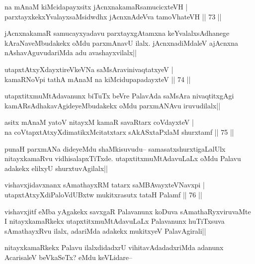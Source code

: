 \begin{shl}
na mAnaM kiMcidapayxsitx jAcnxnakamaRsamucicxteVH |\\
parxtayxkekxYvalayxsaMsidwdhx jAcnxnAdeVva tamoVhateVH \hfill || 73 ||
\end{shl}

\begin{artha}
jAcnxnakamaR samucayxyadavu parxtayxgAtamxna keYvalalxsAdhanege kAraNaveMbudakekx oMdu parxmAnavU ilalx. jAcnxnadiMdaleV ajAcnxna nAshavAguvudariMda adu avashayxvilalx||
\end{artha}

\begin{shl}
utapxtAtxyXdayxtireVkeVNa saMsAravinivaqtatxyeV |\\
kamaRNoV\s pi tathA mAnaM na kiMcidupapadayxteV \hfill || 74 ||
\end{shl}

\begin{artha}
utapxtitxmuMtAdavanunx biTuTx beVre PalavAda saMsAra nivaqtitxgAgi kamARsAdhakavAgideyeMbudakekx oMdu parxmANAvu iruvudilalx||
\end{artha}


\begin{shl}
asitx mAnaM yatoV nitayxM kamaR savaRtarx coVdayxteV |\\
na coVtapxtAtxyXdimatikxMcitatxtarx sAkASxtaPxlaM shurxtamf \hfill || 75 ||
\end{shl}

\begin{artha}
punaH parxmANa dideyeMdu shaMkisuvudu-- samasatxshurxtigaLalUlx nitayxkamaRvu vidhisalapxTiTxde. utapxtitxmuMtAdavuLaLx oMdu Palavu adakekx elilxyU shurxtuvAgilalx||
\end{artha}

\begin{shl}
vishavxjidavxnanx sAmathayxRM tatarx saMBAvayxteV\s Navxpi |\\
utapxtAtxyXdiPaloVdUBxtw mukitxrasutx tataH Palamf \hfill || 76 ||
\end{shl}

\begin{artha}
vishavxjitf eMba yAgakekx savxgaR Palavanunx koDuva sAmathaRyxviruvaMte I nitayxkamaRkekx utapxtitxmuMtAdavuLaLx Palavanunx huTiTxsuva sAmathayxRvu ilalx, adariMda adakekx mukitxyeV PalavAgirali||
\end{artha}

\begin{artha}
nitayxkamaRkekx Palavu ilalxdidadxrU vihitavAdadadxriMda adanunx AcarisaleV beVkaSeTx? eMdu keVLidare--
\end{artha}

